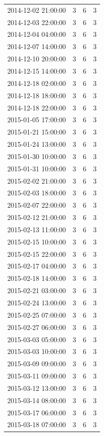 \begin{tabular}{lrrr}
2014-12-02 21:00:00 & 3 & 6 & 3 \\
2014-12-03 22:00:00 & 3 & 6 & 3 \\
2014-12-04 04:00:00 & 3 & 6 & 3 \\
2014-12-07 14:00:00 & 3 & 6 & 3 \\
2014-12-10 20:00:00 & 3 & 6 & 3 \\
2014-12-15 14:00:00 & 3 & 6 & 3 \\
2014-12-18 02:00:00 & 3 & 6 & 3 \\
2014-12-18 18:00:00 & 3 & 6 & 3 \\
2014-12-18 22:00:00 & 3 & 6 & 3 \\
2015-01-05 17:00:00 & 3 & 6 & 3 \\
2015-01-21 15:00:00 & 3 & 6 & 3 \\
2015-01-24 13:00:00 & 3 & 6 & 3 \\
2015-01-30 10:00:00 & 3 & 6 & 3 \\
2015-01-31 10:00:00 & 3 & 6 & 3 \\
2015-02-02 21:00:00 & 3 & 6 & 3 \\
2015-02-03 18:00:00 & 3 & 6 & 3 \\
2015-02-07 22:00:00 & 3 & 6 & 3 \\
2015-02-12 21:00:00 & 3 & 6 & 3 \\
2015-02-13 11:00:00 & 3 & 6 & 3 \\
2015-02-15 10:00:00 & 3 & 6 & 3 \\
2015-02-15 22:00:00 & 3 & 6 & 3 \\
2015-02-17 04:00:00 & 3 & 6 & 3 \\
2015-02-18 14:00:00 & 3 & 6 & 3 \\
2015-02-21 03:00:00 & 3 & 6 & 3 \\
2015-02-24 13:00:00 & 3 & 6 & 3 \\
2015-02-25 07:00:00 & 3 & 6 & 3 \\
2015-02-27 06:00:00 & 3 & 6 & 3 \\
2015-03-03 05:00:00 & 3 & 6 & 3 \\
2015-03-03 10:00:00 & 3 & 6 & 3 \\
2015-03-09 09:00:00 & 3 & 6 & 3 \\
2015-03-11 09:00:00 & 3 & 6 & 3 \\
2015-03-12 13:00:00 & 3 & 6 & 3 \\
2015-03-14 08:00:00 & 3 & 6 & 3 \\
2015-03-17 06:00:00 & 3 & 6 & 3 \\
2015-03-18 07:00:00 & 3 & 6 & 3 \\

\end{tabular}
